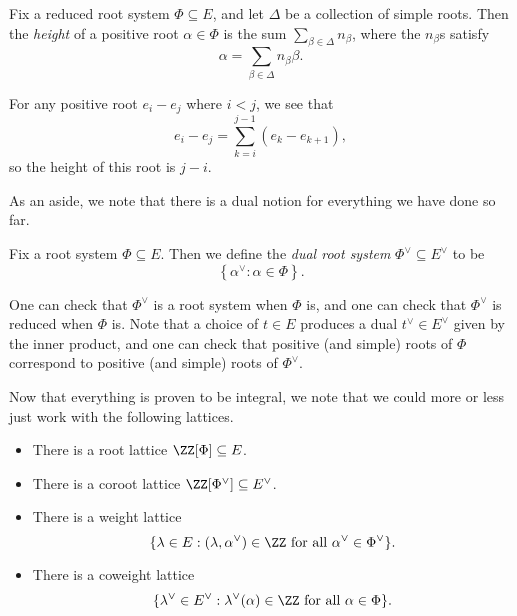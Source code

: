 \documentclass[../notes.tex]{subfiles}
\begin{document}
\begin{definition}[height]
	Fix a reduced root system $\Phi\subseteq E$, and let $\Delta$ be a collection of simple roots. Then the \textit{height} of a positive root $\alpha\in\Phi$ is the sum $\sum_{\beta\in\Delta}n_\beta$, where the $n_\beta$s satisfy
	\[\alpha=\sum_{\beta\in\Delta}n_\beta\beta.\]
\end{definition}
\begin{example}
	For any positive root $e_i-e_j$ where $i<j$, we see that
	\[e_i-e_j=\sum_{k=i}^{j-1}(e_k-e_{k+1}),\]
	so the height of this root is $j-i$.
\end{example}
As an aside, we note that there is a dual notion for everything we have done so far.
\begin{definition}
	Fix a root system $\Phi\subseteq E$. Then we define the \textit{dual root system} $\Phi^\lor\subseteq E^\lor$ to be
	\[\left\{\alpha^\lor:\alpha\in\Phi\right\}.\]
\end{definition}
\begin{remark}
	One can check that $\Phi^\lor$ is a root system when $\Phi$ is, and one can check that $\Phi^\lor$ is reduced when $\Phi$ is. Note that a choice of $t\in E$ produces a dual $t^\lor\in E^\lor$ given by the inner product, and one can check that positive (and simple) roots of $\Phi$ correspond to positive (and simple) roots of $\Phi^\lor$.
\end{remark}
\begin{remark}
	Now that everything is proven to be integral, we note that we could more or less just work with the following lattices.
	\begin{itemize}
		\item There is a root lattice $\ZZ[\Phi]\subseteq E$.
		\item There is a coroot lattice $\ZZ[\Phi^\lor]\subseteq E^\lor$.
		\item There is a weight lattice
		\[\{\lambda\in E:(\lambda,\alpha^\lor)\in\ZZ\text{ for all }\alpha^\lor\in\Phi^\lor\}.\]
		\item There is a coweight lattice
		\[\{\lambda^\lor\in E^\lor:\lambda^\lor(\alpha)\in\ZZ\text{ for all }\alpha\in\Phi\}.\]
	\end{itemize}
\end{remark}
\end{document}
